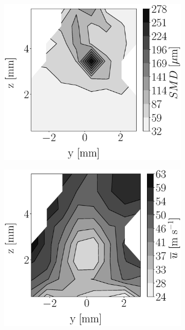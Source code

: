 

\begin{figure}[h!]
\flushleft
\begin{subfigure}[b]{0.22\textwidth}
	\centering
   \includegraphics[scale=0.17]{./part2_developments/figures_ch5_resolved_JICF/injectors_SLI/uG75_dx10_x05_SMD_map.eps}
\end{subfigure}
   \hspace{0.17in}
\begin{subfigure}[b]{0.22\textwidth}
	\centering
   \includegraphics[scale=0.17]{./part2_developments/figures_ch5_resolved_JICF/injectors_SLI/uG75_dx10_x05_ux_mean_map.eps}

\end{subfigure}
\end{figure}
